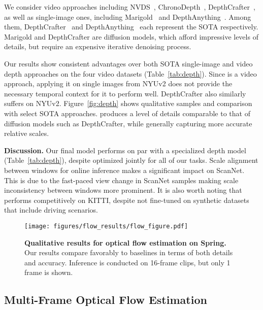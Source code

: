 We consider video approaches including NVDS~\cite{wang2023nvds}, ChronoDepth~\cite{shao2024chronodepth}, DepthCrafter~\cite{hu2024depthcrafter}, 
as well as single-image ones, including Marigold~\cite{ke2024repurposing} and DepthAnything~\cite{yang2024depthanything,yang2024depthanythingv2}. 
Among them, DepthCrafter~\cite{hu2024depthcrafter} and DepthAnything~\cite{yang2024depthanything,yang2024depthanythingv2} each represent the SOTA respectively. 
Marigold and DepthCrafter are diffusion models, which afford impressive levels of details, but require an expensive iterative denoising process. 

Our results show consistent advantages over both SOTA single-image and video depth approaches on the four video datasets (Table~\ref{tab:depth}). 
Since \methodName is a video approach, applying it on single images from NYUv2 does not provide the necessary temporal context for it to perform well. 
DepthCrafter also similarly suffers on NYUv2. 
Figure~\ref{fig:depth} shows qualitative samples and comparison with select SOTA approaches. 
\methodName produces a level of details comparable to that of diffusion models such as DepthCrafter, while generally capturing more accurate relative scales.

\noindent
\textbf{Discussion.} Our final model performs on par with a specialized depth model (Table~\ref{tab:depth}), 
despite optimized jointly for all of our tasks. 
Scale alignment between windows for online inference makes a significant impact on ScanNet. 
This is due to the fast-paced view change in ScanNet samples making scale inconsistency between windows more prominent. 
It is also worth noting that \methodName performs competitively on KITTI, despite not fine-tuned on synthetic datasets that include driving scenarios.



\begin{figure}
    \centering
    \texttt{[image: figures/flow\_results/flow\_figure.pdf]}
    \caption{
        \textbf{Qualitative results for optical flow estimation on Spring.}
        Our results compare favorably to baselines in terms of both details and accuracy. 
        Inference is conducted on 16-frame clips, but only 1 frame is shown. 
        }\label{fig:flow}
\end{figure}

\subsection{Multi-Frame Optical Flow Estimation}

